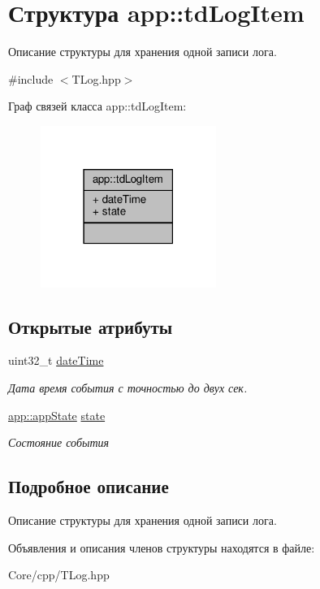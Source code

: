 \hypertarget{structapp_1_1td_log_item}{}\section{Структура app\+:\+:td\+Log\+Item}
\label{structapp_1_1td_log_item}


Описание структуры для хранения одной записи лога.  




{\ttfamily \#include $<$T\+Log.\+hpp$>$}



Граф связей класса app\+:\+:td\+Log\+Item\+:\nopagebreak
\begin{figure}[H]
\begin{center}
\leavevmode
\includegraphics[width=162pt]{structapp_1_1td_log_item__coll__graph}
\end{center}
\end{figure}
\subsection*{Открытые атрибуты}
\begin{DoxyCompactItemize}
\item 
\mbox{\label{structapp_1_1td_log_item_a5cb3959fafb84783a88a840f8427e4e6}} 
uint32\+\_\+t \hyperlink{structapp_1_1td_log_item_a5cb3959fafb84783a88a840f8427e4e6}{date\+Time}
\begin{DoxyCompactList}\small\item\em Дата время события с точностью до двух сек. \end{DoxyCompactList}\item 
\mbox{\label{structapp_1_1td_log_item_ade62dcc4582ad2247c47a3e68889d118}} 
\hyperlink{namespaceapp_a290e8080c661e52c2f685fd4af148acf}{app\+::app\+State} \hyperlink{structapp_1_1td_log_item_ade62dcc4582ad2247c47a3e68889d118}{state}
\begin{DoxyCompactList}\small\item\em Состояние события \end{DoxyCompactList}\end{DoxyCompactItemize}


\subsection{Подробное описание}
Описание структуры для хранения одной записи лога. 

Объявления и описания членов структуры находятся в файле\+:\begin{DoxyCompactItemize}
\item 
Core/cpp/T\+Log.\+hpp\end{DoxyCompactItemize}
